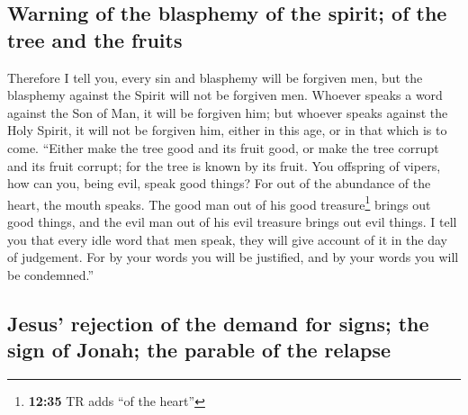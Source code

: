 \hypertarget{warning-of-the-blasphemy-of-the-spirit-of-the-tree-and-the-fruits}{%
\subsection{Warning of the blasphemy of the spirit; of the tree and the
fruits}\label{warning-of-the-blasphemy-of-the-spirit-of-the-tree-and-the-fruits}}

 Therefore I tell you, every sin and blasphemy will be
forgiven men, but the blasphemy against the Spirit will not be forgiven
men.  Whoever speaks a word against the Son of Man, it
will be forgiven him; but whoever speaks against the Holy Spirit, it
will not be forgiven him, either in this age, or in that which is to
come.  ``Either make the tree good and its fruit good, or
make the tree corrupt and its fruit corrupt; for the tree is known by
its fruit.  You offspring of vipers, how can you, being
evil, speak good things? For out of the abundance of the heart, the
mouth speaks.  The good man out of his good
treasure\footnote{\textbf{12:35} TR adds ``of the heart''} brings out
good things, and the evil man out of his evil treasure brings out evil
things.  I tell you that every idle word that men speak,
they will give account of it in the day of judgement. 
For by your words you will be justified, and by your words you will be
condemned.''

\hypertarget{jesus-rejection-of-the-demand-for-signs-the-sign-of-jonah-the-parable-of-the-relapse}{%
\subsection{Jesus' rejection of the demand for signs; the sign of Jonah;
the parable of the
relapse}\label{jesus-rejection-of-the-demand-for-signs-the-sign-of-jonah-the-parable-of-the-relapse}}

